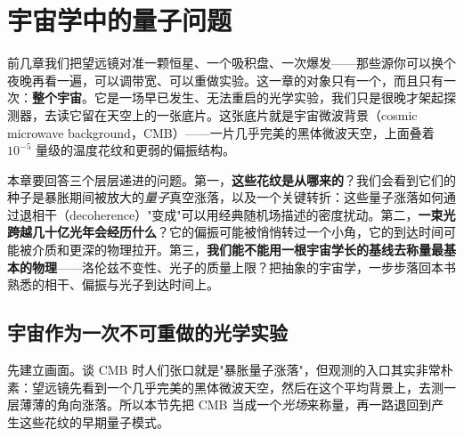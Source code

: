 \chapter{宇宙学中的量子问题}
\label{chap:e23}

\begin{chapteropening}
前几章我们把望远镜对准一颗恒星、一个吸积盘、一次爆发——那些源你可以换个夜晚再看一遍，可以调带宽、可以重做实验。这一章的对象只有一个，而且只有一次：\textbf{整个宇宙}。它是一场早已发生、无法重启的光学实验，我们只是很晚才架起探测器，去读它留在天空上的一张底片。这张底片就是宇宙微波背景（cosmic microwave background，CMB）——一片几乎完美的黑体微波天空，上面叠着 \(10^{-5}\) 量级的温度花纹和更弱的偏振结构。

本章要回答三个层层递进的问题。第一，\textbf{这些花纹是从哪来的}？我们会看到它们的种子是暴胀期间被放大的\emph{量子}真空涨落，以及一个关键转折：这些量子涨落如何通过退相干（decoherence）"变成"可以用经典随机场描述的密度扰动。第二，\textbf{一束光跨越几十亿光年会经历什么}？它的偏振可能被悄悄转过一个小角，它的到达时间可能被介质和更深的物理拉开。第三，\textbf{我们能不能用一根宇宙学长的基线去称量最基本的物理}——洛伦兹不变性、光子的质量上限？把抽象的宇宙学，一步步落回本书熟悉的相干、偏振与光子到达时间上。
\end{chapteropening}

\section{宇宙作为一次不可重做的光学实验}
\label{sec:e23-lightfield}

先建立画面。谈 CMB 时人们张口就是"暴胀量子涨落"，但观测的入口其实非常朴素：望远镜先看到一个几乎完美的黑体微波天空，然后在这个平均背景上，去测一层薄薄的角向涨落。所以本节先把 CMB 当成一个\emph{光场}来称量，再一路退回到产生这些花纹的早期量子模式。

